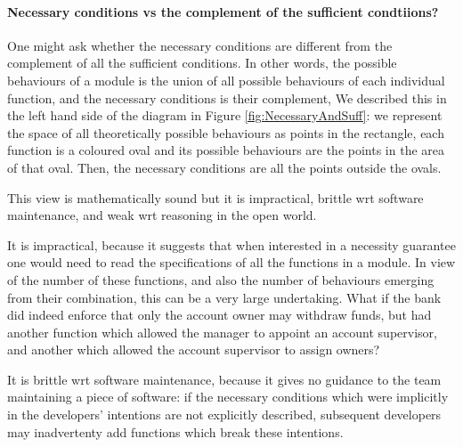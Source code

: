 \paragraph{Necessary conditions vs the complement of the sufficient condtiions?}
One might ask whether the necessary conditions are different from the complement of all the sufficient conditions.
In other words, the possible behaviours of a module is the union of all possible behaviours of 
each individual function, and the necessary conditions is their complement,
We described this in the left hand side of the diagram in Figure \ref{fig:NecessaryAndSuff}: we 
represent the space of all theoretically possible behaviours as points in the rectangle, 
each function is a coloured oval and its possible behaviours are the points in the area of that oval.   
Then, the necessary conditions are all the points  outside the ovals.  

This view is mathematically sound but it is  impractical,  brittle wrt software maintenance, and weak wrt reasoning in the open world.



It is impractical, because it suggests that when interested in a necessity guarantee 
one would need to read the specifications of all the functions  in a module.
In view of the number of these functions, and also 
  the number of   behaviours emerging from their combination, this can be a  very large undertaking.
 What if the bank did indeed enforce that only the account
owner may withdraw funds, but had another function which allowed the manager
to appoint an account supervisor, and another which allowed the account supervisor to
assign owners?

It is brittle wrt software maintenance, because it
 gives no guidance to the team maintaining a piece of software: if the 
necessary conditions which were implicitly in the developers' intentions are not explicitly 
described, subsequent developers may inadvertenty add functions which break these intentions.

